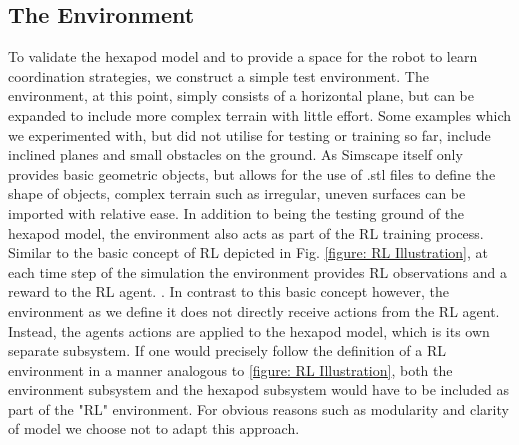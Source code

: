 \begin{comment}
The  thorax is represented by a rigid body and a main coordinate frame.
Each of the robots legs consists of 3 rigid bodies(coxa, femur and tibia) which are connected to each other by 2 joints.
A third joint then attaches the coxa and the leg as a whole to the main body.
Like the leg of an insect, the movement plane of the joint connecting coxa and thorax is parallel to the ground and orthogonal towards the other two joints.
Each of the joints used has 1 (rotational) DoF.
To position each rigid body and joint correctly, rigid transformations are used to translate and rotate each component.

As mentioned above, joints can receive as input a torque to be applied and can output sensory data, such as the joints position, velocity and acceleration. 
\end{comment}



\subsection{The Environment}
To validate the hexapod model and to provide a space for the robot to learn coordination strategies, we construct a simple test environment.
The environment, at this point, simply consists of a horizontal plane, but can be expanded to include more complex terrain with little effort.
Some examples which we experimented with, but did not utilise for testing or training so far, include inclined planes and small obstacles on the ground.
As Simscape itself only provides basic geometric objects, but allows for the use of .stl files to define the shape of objects, complex terrain such as irregular, uneven surfaces can be imported with relative ease. 
In addition to being the testing ground of the hexapod model, the environment also acts as part of the RL training process.
Similar to the basic concept of RL depicted in Fig. \ref{figure: RL Illustration}, at each time step of the simulation the environment provides RL observations and a reward to the RL agent. .
In contrast to this basic concept however, the environment as we define it does not directly receive actions from the RL agent.
Instead, the agents actions are applied to the hexapod model, which is its own separate subsystem.
If one would precisely follow the definition of a RL environment in a manner analogous to \ref{figure: RL Illustration}, both the environment subsystem and the hexapod subsystem would have to be included as part of the "RL" environment.
For obvious reasons such as modularity and clarity of model we choose not to adapt this approach.

